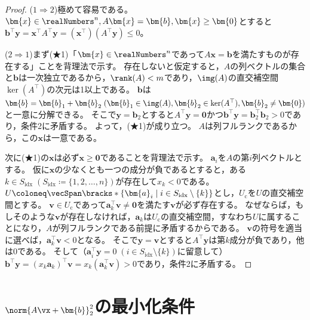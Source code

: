         \begin{proof}
            ($1\Rightarrow 2$)極めて容易である。$\bm{x}\in\realNumbers^n,A\bm{x}=\bm{b},\bm{x}\geq\bm{0}$とすると$\bm{b}^\top\bm{y} = \bm{x}^\top A^\top\bm{y} = (\bm{x}^\top)(A^\top\bm{y})\leq 0$。
            \par\noindent
            ($2\Rightarrow 1$)まず(★1)「$\bm{x}\in\realNumbers^n$であって$A\bm{x}=\bm{b}$を満たすものが存在する」ことを背理法で示す。
            存在しないと仮定すると，$A$の列ベクトルの集合と$\bm{b}$は一次独立であるから，$\rank(A)<m$であり，$\img(A)$の直交補空間$\ker(A^\top)$の次元は1以上である。
            $\bm{b}$は$\bm{b}=\bm{b}_1+\bm{b}_2\;(\bm{b}_1\in\img(A),\bm{b}_2\in \ker(A^\top),\bm{b}_2\neq\bm{0})$と一意に分解できる。
            そこで$\bm{y}=\bm{b}_2$とすると$A^\top\bm{y}=\bm{0}$かつ$\bm{b}^\top\bm{y} = \bm{b}_2^\top\bm{b}_2 > 0$であり，条件2に矛盾する。
            よって，(★1)が成り立つ。
            $A$は列フルランクであるから，この$\bm{x}$は一意である。
            \par
            次に(★1)の$\bm{x}$は必ず$\bm{x}\geq\bm{0}$であることを背理法で示す。
            $\bm{a}_i$を$A$の第$i$列ベクトルとする。
            仮に$\bm{x}$の少なくとも一つの成分が負であるとすると，ある$k\in S_\mathrm{idx}\;(S_\mathrm{idx}\coloneq\{1,2,\dots,n\})$が存在して$x_k<0$である。
            $U\coloneq\vecSpan\bracks*{\{\bm{a}_i \mid i\in S_\mathrm{idx}\setminus\{k\}\}}$とし，$U_\mathrm{c}$を$U$の直交補空間とする。
            $\bm{v}\in U_\mathrm{c}$であって$\bm{a}_k^\top\bm{v}\neq\bm{0}$を満たす$\bm{v}$が必ず存在する。
            なぜならば，もしそのような$\bm{v}$が存在しなければ，$\bm{a}_k$は$U_\mathrm{c}$の直交補空間，すなわち$U$に属することになり，$A$が列フルランクである前提に矛盾するからである。
            $\bm{v}$の符号を適当に選べば，$\bm{a}_k^\top\bm{v}<0$となる。
            そこで$\bm{y}=\bm{v}$とすると$A^\top\bm{y}$は第$k$成分が負であり，他は0である。
            そして（$\bm{a}_i^\top\bm{y}=0\;(i\in S_\mathrm{idx}\setminus\{k\})$に留意して）$\bm{b}^\top\bm{y} = (x_k\bm{a}_k)^\top\bm{v} = x_k(\bm{a}_k^\top\bm{v}) > 0$であり，条件2に矛盾する。
        \end{proof}
    \section{\texorpdfstring{$\norm{A\vx + \bm{b}}_2^2$}{||Ax+b||\_2}の最小化条件}
